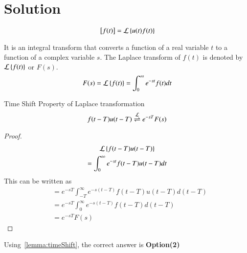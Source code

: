 \documentclass[journal,12pt,twocolumn]{IEEEtran}
\begin{document}
\section{Solution}
\begin{definition}
\begin{align}
    {}\left[f (t)\right]=\mathcal{L}\left\{u (t) f (t)\right\}
\end{align}
\end{definition}
\begin{definition}
    It is an integral transform that converts a function of a real variable $t$ to a function of a complex variable $s$. The Laplace transform of $f(t)$ is denoted by $\mathcal{L}\left\{f(t)\right\}$ or $F(s)$.
    \begin{align}
        F(s)=\mathcal{L}\left\{f(t)\right\}=\int_{0}^{\infty}e^{-st}f(t)dt
    \end{align}
\end{definition}
\begin{lemma}\label{lemma:timeShift}
    Time Shift Property of Laplace transformation
    \begin{align}
        f(t-T)u(t-T) \overset{\mathcal{L}}{ \rightleftharpoons} e^{-sT}F(s)
    \end{align}
\end{lemma}
\begin{proof}
    \begin{multline}
        \mathcal{L}\left\{f(t-T)u(t-T)\right\}\\=\int_{0}^{\infty}e^{-st}f(t-T)u(t-T)dt\\
    \end{multline}
    This can be written as
    \begin{align}
        &=e^{-sT}\int_{-T}^{\infty}e^{-s(t-T)}f(t-T)u(t-T)d(t-T)\\
        &=e^{-sT}\int_{0}^{\infty}e^{-s(t-T)}f(t-T)d(t-T)\\
        &=e^{-sT}F(s)
    \end{align}

\end{proof}

Using~\eqref{lemma:timeShift}, the correct answer is \textbf{Option(2)}
\end{document}
